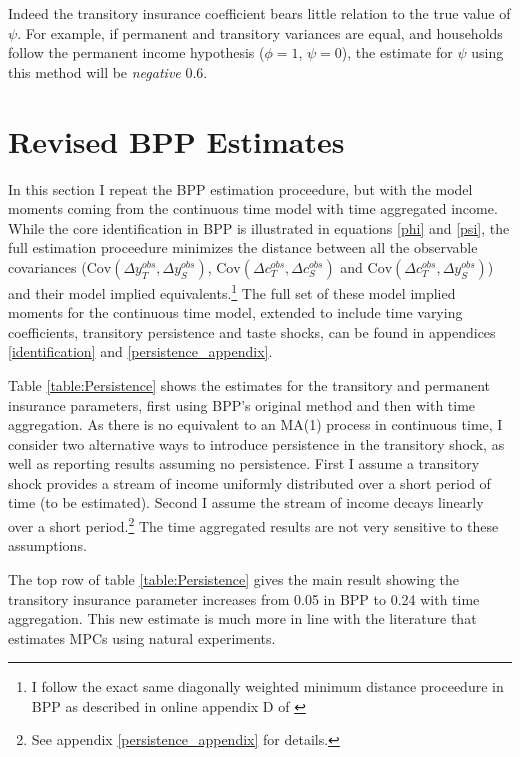 \documentclass[AER]{AEA}
\begin{document}
Indeed the transitory insurance coefficient bears little relation to the true value of $\psi$. For example, if permanent and transitory variances are equal, and households follow the permanent income hypothesis ($\phi=1$, $\psi=0$), the estimate for $\psi$ using this method will be \textit{negative} 0.6.

\section{Revised BPP Estimates} \label{evidence}

In this section I repeat the BPP estimation proceedure, but with the model moments coming from the continuous time model with time aggregated income. While the core identification in BPP is illustrated in equations \ref{phi} and \ref{psi}, the full estimation proceedure minimizes the distance between all the observable covariances ($ \mathrm{Cov}(\Delta y^{obs}_T, \Delta y^{obs}_S)$, $\mathrm{Cov}(\Delta c^{obs}_T, \Delta c^{obs}_S)$ and $\mathrm{Cov}(\Delta c^{obs}_T,  \Delta y^{obs}_S)$) and their model implied equivalents.\footnote{I follow the exact same diagonally weighted minimum distance proceedure in BPP as described in online appendix D of \cite{blundell_consumption_2008}} The full set of these model implied moments for the continuous time model, extended to include time varying coefficients, transitory persistence and taste shocks, can be found in appendices \ref{identification} and \ref{persistence_appendix}. 



Table \ref{table:Persistence} shows the estimates for the transitory and permanent insurance parameters, first using BPP's original method and then with time aggregation. As there is no equivalent to an MA(1) process in continuous time, I consider two alternative ways to introduce persistence in the transitory shock, as well as reporting results assuming no persistence. First I assume a transitory shock provides a stream of income uniformly distributed over a short period of time (to be estimated). Second I assume the stream of income decays linearly over a short period.\footnote{See appendix \ref{persistence_appendix} for details.} The time aggregated results are not very sensitive to these assumptions.

The top row of table \ref{table:Persistence} gives the main result showing the transitory insurance parameter increases from 0.05 in BPP to 0.24 with time aggregation. This new estimate is much more in line with the literature that estimates MPCs using natural experiments.
\end{document}
